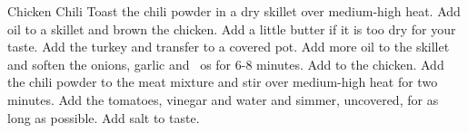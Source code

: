 \begin{recipe}{Chicken Chili}{}{}
Toast the chili powder in a dry skillet over medium-high heat.
Add oil to a skillet and brown the chicken. Add a little butter if it is too dry for your taste.  Add the turkey and transfer to a covered pot. 
Add more oil to the skillet and soften the onions, garlic and ~os for 6-8 minutes.  Add to the chicken.
\newstep
Add the chili powder to the meat mixture and stir over medium-high heat for two minutes.
Add the tomatoes, vinegar and water and simmer, uncovered, for as long as possible.  Add salt to taste.
\end{recipe}
